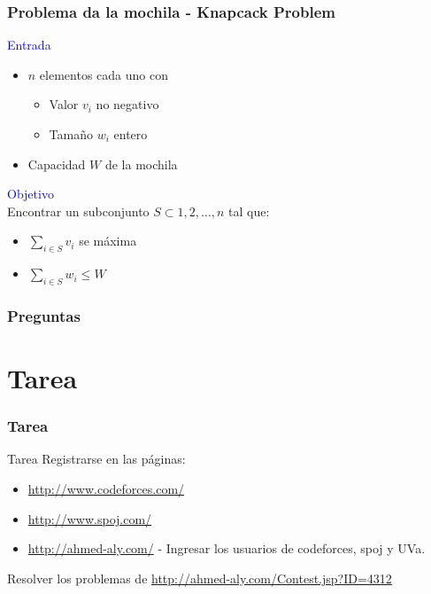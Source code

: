 \documentclass{beamer}
\begin{document}
	\begin{frame}
		\frametitle{Problema da la mochila - Knapcack Problem}
		\textcolor{blue}{\large Entrada}\\
		\begin{itemize}
			\item $n$ elementos cada uno con 
				\begin{itemize}
					\item Valor $v_i$ no negativo
					\item Tamaño $w_i$ entero
				\end{itemize}
			\item Capacidad $W$ de la mochila
		\end{itemize}
		\textcolor{blue}{\large Objetivo}\\
		Encontrar un subconjunto $S \subset {1, 2, \ldots , n}$ tal que:
		\begin{itemize}
			\item $\displaystyle\sum_{i \in S}{v_i}$ se máxima
			\item $\displaystyle\sum_{i \in S}{w_i} \leq W$
		\end{itemize}
	\end{frame}
	
	\begin{frame}
		\frametitle{Preguntas}
		
	\end{frame}



\section{Tarea}
	\begin{frame}[fragile]
		\frametitle{Tarea}
		\begin{alertblock}{Tarea}
			Registrarse en las páginas:
			\begin{itemize}
				\item \url{http://www.codeforces.com/}
				\item \url{http://www.spoj.com/}
				\item \url{http://ahmed-aly.com/} - Ingresar los usuarios de codeforces, spoj y UVa.
			\end{itemize}	
			Resolver los problemas de \url{http://ahmed-aly.com/Contest.jsp?ID=4312}
		\end{alertblock}
	\end{frame}
\end{document}
